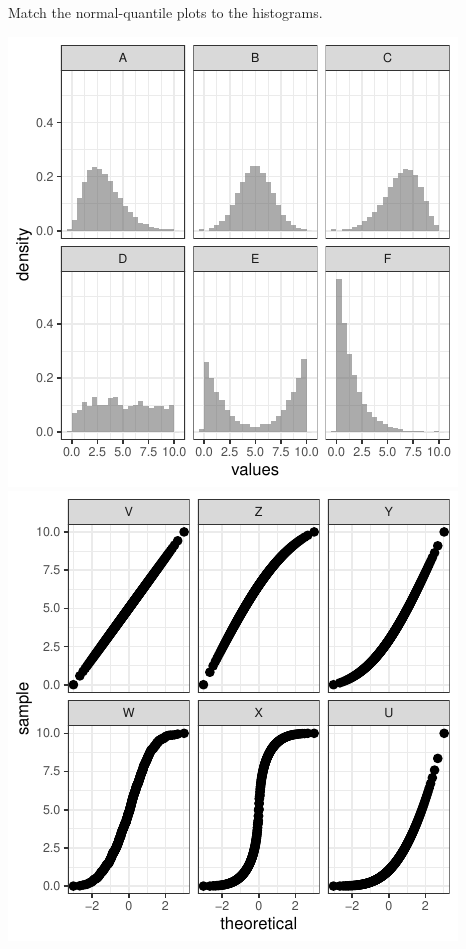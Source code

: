 \documentclass[twoside]{book}\usepackage[]{graphicx}\usepackage[]{xcolor}
\makeatletter
\def\maxwidth{ %
  \ifdim\Gin@nat@width>\linewidth
    \linewidth
  \else
    \Gin@nat@width
  \fi
}
\newenvironment{knitrout}{}{} %
\makeatother
\begin{document}
\begin{problem}
	Match the normal-quantile plots to the histograms.


\begin{knitrout}
\color{fgcolor}

{\centering \includegraphics[width=\maxwidth]{figures/fig-compareplots1-1} 
\includegraphics[width=\maxwidth]{figures/fig-compareplots1-2} 

}



\end{knitrout}

\end{problem}
\end{document}

